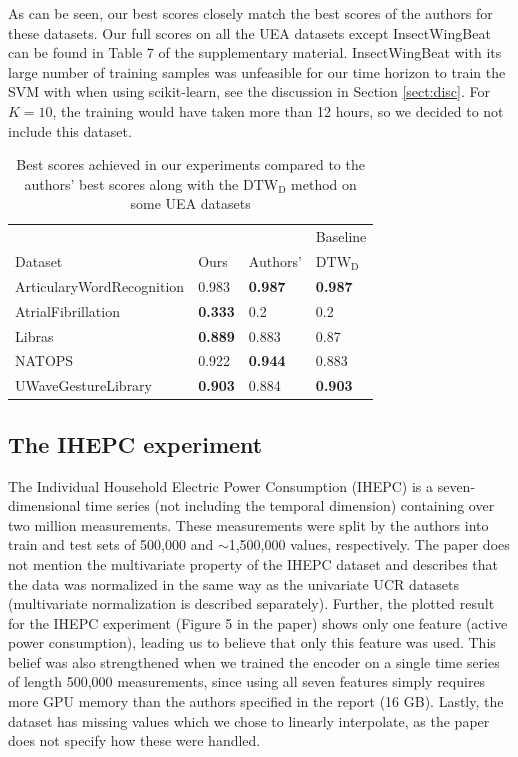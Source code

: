 As can be seen, our best scores closely match the best scores of the authors for these datasets. Our full scores on all the UEA datasets except InsectWingBeat can be found in Table 7 of the supplementary material. InsectWingBeat with its large number of training samples was unfeasible for our time horizon to train the SVM with when using scikit-learn, see the discussion in Section \ref{sect:disc}. For $K=10$, the training would have taken more than 12 hours, so we decided to not include this dataset.


\begin{table}[h!]
\caption{Best scores achieved in our experiments compared to the authors' best scores along with the $\mathrm{DTW_D}$ method on some UEA datasets}
\label{tab:uea}
\centering
\begin{tabular}{llll}
    \hline
               &       &          & \vrule Baseline \\
    
    Dataset          & Ours  & Authors' &\vrule $\mathrm{DTW_D}$  \\
    \hline
    ArticularyWordRecognition & 0.983           & \textbf{0.987}    & \textbf{0.987} \\
    AtrialFibrillation        & \textbf{0.333}   & 0.2      & 0.2   \\
    Libras                    & \textbf{0.889} & 0.883             & 0.87           \\
    NATOPS                    & 0.922 & \textbf{0.944}    & 0.883          \\
    UWaveGestureLibrary       & \textbf{0.903}          & 0.884             & \textbf{0.903}
\end{tabular}
\end{table}


\subsection{The IHEPC experiment}
\label{ihepc}
The Individual Household Electric Power Consumption (IHEPC) is a seven-dimensional time series (not including the temporal dimension) containing over two million measurements. These measurements were split by the authors into train and test sets of 500,000 and $\sim$1,500,000 values, respectively. The paper does not mention the multivariate property of the IHEPC dataset and describes that the data was normalized in the same way as the univariate UCR datasets (multivariate normalization is described separately). Further, the plotted result for the IHEPC experiment (Figure 5 in the paper) shows only one feature (active power consumption), leading us to believe that only this feature was used. This belief was also strengthened when we trained the encoder on a single time series of length 500,000 measurements, since using all seven features simply requires more GPU memory than the authors specified in the report (16 GB). Lastly, the dataset has missing values which we chose to linearly interpolate, as the paper does not specify how these were handled.

